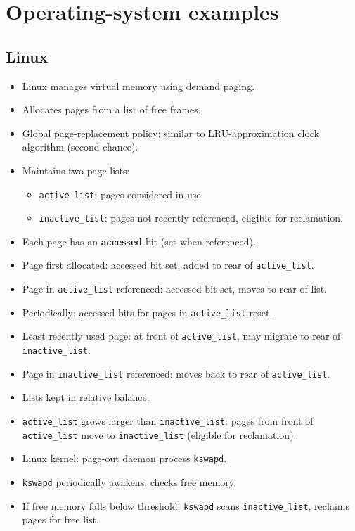 \section{Operating-system examples}

\subsection{Linux}
\begin{itemize}
    \item Linux manages virtual memory using demand paging.
    \item Allocates pages from a list of free frames.
    \item Global page-replacement policy: similar to LRU-approximation clock algorithm (second-chance).
    \item Maintains two page lists:
    \begin{itemize}
        \item \texttt{active\_list}: pages considered in use.
        \item \texttt{inactive\_list}: pages not recently referenced, eligible for reclamation.
    \end{itemize}
    \item Each page has an \textbf{accessed} bit (set when referenced).
    \item Page first allocated: accessed bit set, added to rear of \texttt{active\_list}.
    \item Page in \texttt{active\_list} referenced: accessed bit set, moves to rear of list.
    \item Periodically: accessed bits for pages in \texttt{active\_list} reset.
    \item Least recently used page: at front of \texttt{active\_list}, may migrate to rear of \texttt{inactive\_list}.
    \item Page in \texttt{inactive\_list} referenced: moves back to rear of \texttt{active\_list}.
    \item Lists kept in relative balance.
    \item \texttt{active\_list} grows larger than \texttt{inactive\_list}: pages from front of \texttt{active\_list} move to \texttt{inactive\_list} (eligible for reclamation).
    \item Linux kernel: page-out daemon process \texttt{kswapd}.
    \item \texttt{kswapd} periodically awakens, checks free memory.
    \item If free memory falls below threshold: \texttt{kswapd} scans \texttt{inactive\_list}, reclaims pages for free list.
\end{itemize}

